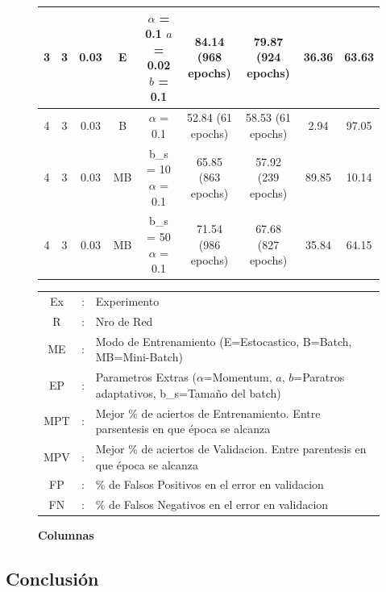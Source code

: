 \begin{figure}[H]
\begin{longtable}{ccccccccc}
	\hline
	3 & 3 & 0.03 & E  & \tcell{$\alpha$ = 0.1\\ $a$ = 0.02\\ $b$ = 0.1} & 84.14 (968 epochs) & 79.87 (924 epochs) & 36.36  & 63.63 \\
	\hline
	\hline
	4 & 3 & 0.03 & B  & $\alpha$ = 0.1                        & 52.84 (61 epochs)  & 58.53 (61 epochs)  & 2.94   & 97.05 \\
	\hline
	4 & 3 & 0.03 & MB & \tcell{b\_s = 10\\ $\alpha$ = 0.1}      & 65.85 (863 epochs) & 57.92 (239 epochs) & 89.85  & 10.14 \\
	\hline
	4 & 3 & 0.03 & MB & \tcell{b\_s = 50\\ $\alpha$ = 0.1}      & 71.54 (986 epochs) & 67.68 (827 epochs) & 35.84  & 64.15 \\
	\hline
\end{longtable}
\caption{\textbf{Columnas}}
\begin{tabular}{ccl}
         Ex & : & Experimento \\
         R & : & Nro de Red \\
         ME & : & Modo de Entrenamiento (E=Estocastico, B=Batch, MB=Mini-Batch)\\
         EP & : & Parametros Extras ($\alpha$=Momentum, $a$, $b$=Paratros adaptativos, b\_s=Tamaño del batch)\\
         MPT & : & Mejor \% de aciertos de Entrenamiento. Entre parsentesis en que época se alcanza\\
         MPV & : & Mejor \% de aciertos de Validacion. Entre parentesis en que época se alcanza\\
         FP & : & \% de Falsos Positivos en el error en validacion\\
         FN & : & \% de Falsos Negativos en el error en validacion
\end{tabular}
\end{figure}



\subsection{Conclusión}

\newpage
